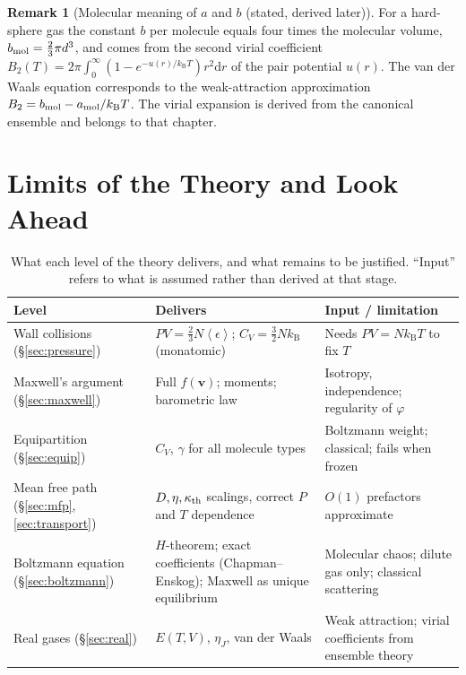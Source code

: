 \documentclass[11pt,a4paper]{report}
\theoremstyle{definition}
\newtheorem{remark}[definition]{Remark}
\theoremstyle{plain}
\newcommand{\kB}{k_{\mathrm{B}}}
\newcommand{\dd}{\mathrm{d}}
\newcommand{\avg}[1]{\left\langle #1\right\rangle}
\newcommand{\vv}{\mathbf{v}}
\begin{document}
\begin{remark}[Molecular meaning of $a$ and $b$ (stated, derived later)]
For a hard-sphere gas the constant $b$ per molecule equals four times the molecular volume, $b_{\rm mol}=\tfrac23\pi d^3$, and comes from the second virial coefficient $B_2(T)=2\pi\int_0^\infty(1-e^{-u(r)/\kB T})r^2\dd r$ of the pair potential $u(r)$. The van der Waals equation corresponds to the weak-attraction approximation $B_2=b_{\rm mol}-a_{\rm mol}/\kB T$. The virial expansion is derived from the canonical ensemble and belongs to that chapter.
\end{remark}

\section{Limits of the Theory and Look Ahead}

\begin{table}[h]
\centering
\caption{What each level of the theory delivers, and what remains to be justified. ``Input'' refers to what is assumed rather than derived at that stage.}
\begin{tabular}{@{}p{3.4cm}p{4.6cm}p{5.8cm}@{}}
\toprule
Level & Delivers & Input / limitation\\
\midrule
Wall collisions (\S\ref{sec:pressure}) & $PV=\tfrac23N\avg\epsilon$; $C_V=\tfrac32N\kB$ (monatomic) & Needs $PV=N\kB T$ to fix $T$\\
Maxwell's argument (\S\ref{sec:maxwell}) & Full $f(\vv)$; moments; barometric law & Isotropy, independence; regularity of $\varphi$\\
Equipartition (\S\ref{sec:equip}) & $C_V$, $\gamma$ for all molecule types & Boltzmann weight; classical; fails when frozen\\
Mean free path (\S\ref{sec:mfp},\ref{sec:transport}) & $D,\eta,\kappa_{\rm th}$ scalings, correct $P$ and $T$ dependence & $O(1)$ prefactors approximate\\
Boltzmann equation (\S\ref{sec:boltzmann}) & $H$-theorem; exact coefficients (Chapman--Enskog); Maxwell as unique equilibrium & Molecular chaos; dilute gas only; classical scattering\\
Real gases (\S\ref{sec:real}) & $E(T,V)$, $\eta_J$, van der Waals & Weak attraction; virial coefficients from ensemble theory\\
\bottomrule
\end{tabular}
\end{table}
\end{document}
